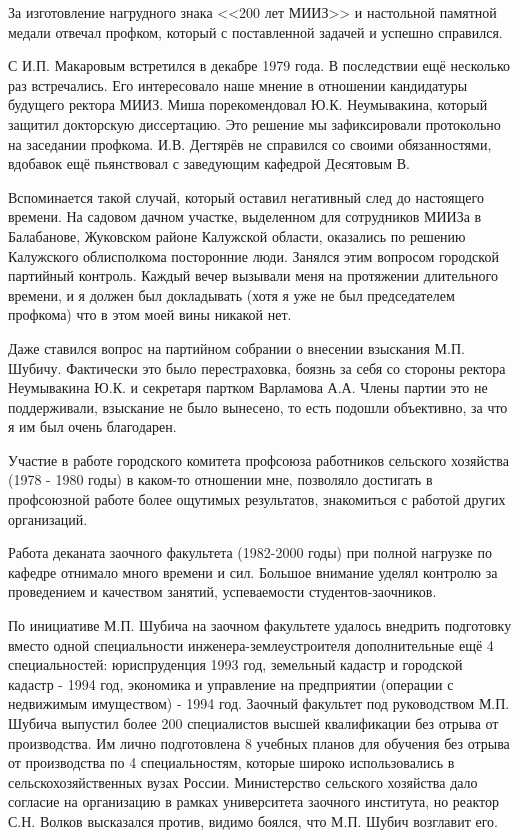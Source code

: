 За изготовление нагрудного знака <<200 лет МИИЗ>> и настольной памятной медали отвечал профком, который с поставленной задачей и успешно справился.

С И.П. Макаровым встретился в декабре 1979 года. В последствии ещё несколько раз встречались. Его интересовало наше мнение в отношении кандидатуры будущего ректора МИИЗ. Миша порекомендовал Ю.К. Неумывакина, который защитил докторскую диссертацию. Это решение мы зафиксировали протокольно на заседании профкома. И.В. Дегтярёв не справился со своими обязанностями, вдобавок ещё пьянствовал с заведующим кафедрой Десятовым В.

Вспоминается такой случай, который оставил негативный след до настоящего времени. На садовом дачном участке, выделенном для сотрудников МИИЗа в Балабанове, Жуковском районе Калужской области, оказались по решению Калужского облисполкома посторонние люди. Занялся этим вопросом городской партийный контроль. Каждый вечер вызывали меня на протяжении длительного времени, и я должен был докладывать (хотя я уже не был председателем профкома) что в этом моей вины никакой нет.

Даже ставился вопрос на партийном собрании о внесении взыскания М.П. Шубичу. Фактически это было перестраховка, боязнь за себя со стороны ректора Неумывакина Ю.К. и секретаря партком Варламова А.А. Члены партии это не поддерживали, взыскание не было вынесено, то есть подошли объективно, за что я им был очень благодарен.

Участие в работе городского комитета профсоюза работников сельского хозяйства (1978 - 1980 годы) в каком-то отношении мне, позволяло достигать в профсоюзной работе более ощутимых результатов, знакомиться с работой других организаций.

Работа деканата заочного факультета (1982-2000 годы) при полной нагрузке по кафедре отнимало много времени и сил. Большое внимание уделял контролю за проведением и качеством занятий, успеваемости студентов-заочников.

По инициативе М.П. Шубича на заочном факультете удалось внедрить подготовку вместо одной специальности инженера-землеустроителя дополнительные ещё 4 специальностей: юриспруденция 1993 год, земельный кадастр и городской кадастр - 1994 год, экономика и управление на предприятии (операции с недвижимым имуществом) - 1994 год. Заочный факультет под руководством М.П. Шубича выпустил более 200 специалистов высшей квалификации без отрыва от производства. Им лично подготовлена 8 учебных планов для обучения без отрыва от производства по 4 специальностям, которые широко использовались в сельскохозяйственных вузах России. Министерство сельского хозяйства дало согласие на организацию в рамках университета заочного института, но реактор С.Н. Волков высказался против, видимо боялся, что М.П. Шубич возглавит его.

